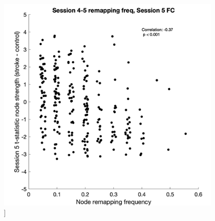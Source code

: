 \documentclass[phd,tocprelim]{cornell}
\renewcommand{\caption}[1]{\singlespacing\hangcaption{#1}\normalspacing}
\begin{document}
\null
\vfill
\clearpage
\null
\vfill
\begin{figure}[h!]
		\ContinuedFloat
		\captionsetup{labelformat=adja-page}
    \centering
    \includegraphics[width=\textwidth]{chapter1/SupplementaryFigure9H.png}
    \caption[]{}
\end{figure}
\null
\vfill
\end{document}
